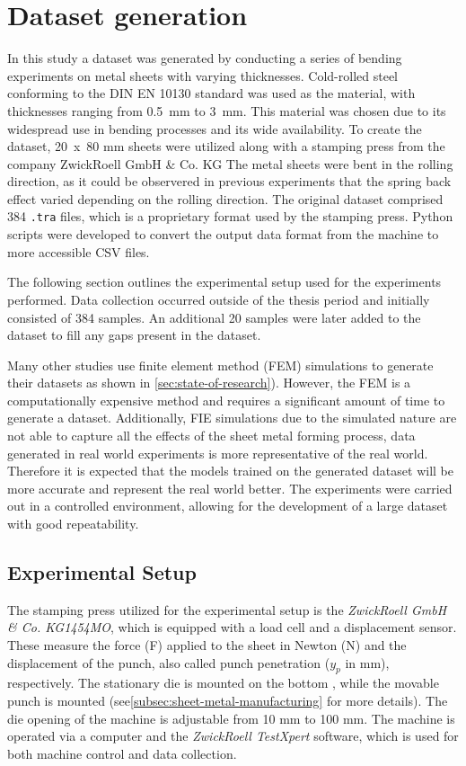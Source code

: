 {\section{Dataset generation}\label{sec:dataset-generation}
In this study a dataset was generated by conducting a series of bending experiments on metal sheets with varying
thicknesses.
Cold-rolled steel conforming to the DIN EN 10130 standard was used as the material, with thicknesses ranging from
0.5~mm to 3~mm.
This material was chosen due to its widespread use in bending processes and its wide availability.
To create the dataset, 20~x~80 mm sheets were utilized along with a stamping press from the company ZwickRoell GmbH
\& Co. KG
The metal sheets were bent in the rolling direction, as it could be observered in previous experiments that the spring
back effect varied depending on the rolling direction.
The original dataset comprised 384 \texttt{.tra} files, which is a proprietary format used by the stamping press.
Python scripts were developed to convert the output data format from the machine to more accessible CSV files.

The following section outlines the experimental setup used for the experiments performed.
Data collection occurred outside of the thesis period and initially consisted of 384 samples.
An additional 20 samples were later added to the dataset to fill any gaps present in the dataset.

Many other studies use finite element method (FEM) simulations to generate their datasets as shown in
\cref{sec:state-of-research}).
However, the FEM is a computationally expensive method and requires a significant amount of time to
generate a dataset.
Additionally, FIE simulations due to the simulated nature are not able to capture all the effects of the sheet metal
forming process, data generated in real world experiments is more representative of the real world.
Therefore it is expected that the models trained on the generated dataset will be more accurate and represent the real
world better.
The experiments were carried out in a controlled environment, allowing for the development of a large dataset with
good repeatability.

\subsection{Experimental Setup}\label{subsec:experimental-setup}
The stamping press utilized for the experimental setup is the \textit{ZwickRoell GmbH \& Co. KG1454MO}, which is
equipped with a load cell
and a displacement sensor.
These measure the force (F) applied to the sheet in Newton (N) and the displacement of the punch, also called
punch penetration ($y_p$ in mm), respectively.
The stationary die is mounted on the bottom , while the movable punch is mounted
(see\cref{subsec:sheet-metal-manufacturing} for more details).
The die opening of the machine is adjustable from 10 mm to 100 mm.
The machine is operated via a computer and the \textit{ZwickRoell TestXpert} software, which is used for both machine
control and data collection.

}
